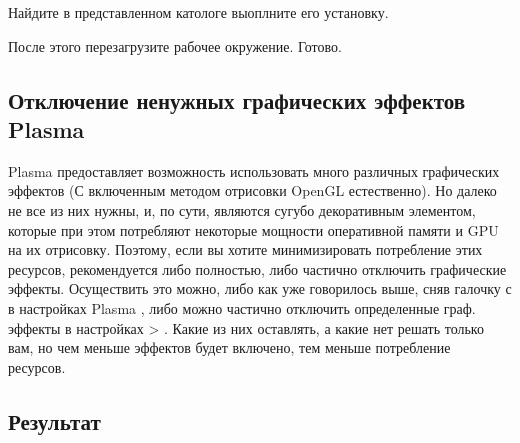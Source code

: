 \documentclass[letterpaper,10pt,russian,openany]{sphinxmanual}
\begin{document}
\sphinxAtStartPar
Найдите в представленном катологе  выоплните его установку.

\noindent{}

\sphinxAtStartPar
После этого перезагрузите рабочее окружение. Готово.

\ignorespaces 

\subsection{Отключение ненужных графических эффектов Plasma}
\label{\detokenize{source/de-optimizations:disabling-kwin-effects}}\label{\detokenize{source/de-optimizations:index-15}}\label{\detokenize{source/de-optimizations:id7}}
\sphinxAtStartPar
Plasma предоставляет возможность использовать много различных графических эффектов (С включенным методом отрисовки OpenGL естественно).
Но далеко не все из них нужны, и, по сути, являются сугубо декоративным элементом,
которые при этом потребляют некоторые мощности оперативной памяти и GPU на их отрисовку.
Поэтому, если вы хотите минимизировать потребление этих ресурсов,
рекомендуется либо полностью, либо частично отключить графические эффекты.
Осуществить это можно, либо как уже говорилось выше, сняв галочку с  в настройках Plasma ,
либо можно частично отключить определенные граф. эффекты в настройках  \sphinxhyphen{}> .
Какие из них оставлять, а какие нет \sphinxhyphen{} решать только вам, но чем меньше эффектов будет включено, тем меньше потребление ресурсов.

\ignorespaces 

\subsection{Результат}
\label{\detokenize{source/de-optimizations:plasma-result}}\label{\detokenize{source/de-optimizations:index-16}}\label{\detokenize{source/de-optimizations:id8}}
\noindent{}

\ignorespaces 
\end{document}
